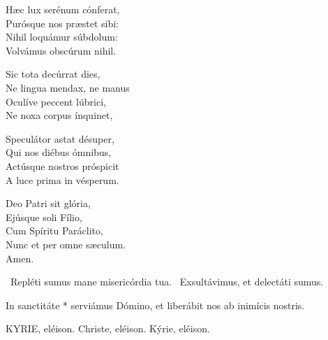 Hæc lux serénum cónferat,\\
Purósque nos præstet sibi:\\
Nihil loquámur súbdolum:\\
Volvámus obscúrum nihil.

Sic tota decúrrat dies,\\
Ne lingua mendax, ne manus\\
Oculíve peccent lúbrici,\\
Ne noxa corpus ínquinet,

Speculátor astat désuper,\\
Qui nos diébus ómnibus,\\
Actúsque nostros próspicit\\
A luce prima in vésperum.

Deo Patri sit glória,\\
Ejúsque soli Fílio,\\
Cum Spíritu Paráclito,\\
Nunc et per omne sæculum.\\
Amen.

\V\ Repléti sumus mane misericórdia tua. \R\ Exsultávimus, et delectáti sumus.

 In sanctitáte * serviámus Dómino, et liberábit nos ab inimícis nostris.



KYRIE, eléison. Christe, eléison. Kýrie, eléison.

